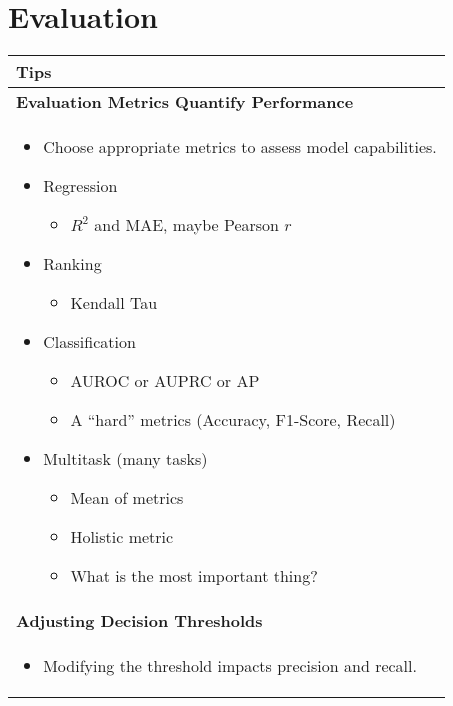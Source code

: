 \section{Evaluation}
\begin{summary}
    \begin{center}
        \begin{tabular}{l}
        \toprule
        \textbf{Tips} \\
        \midrule
        \textbf{Evaluation Metrics Quantify Performance} \\
        \multicolumn{1}{p{\linewidth}}{
        \begin{itemize}
            \item Choose appropriate metrics to assess model capabilities. 
            \item Regression
            \begin{itemize}
                \item \( R^2 \) and MAE, maybe Pearson \( r \)
            \end{itemize}
            \item Ranking
            \begin{itemize}
                \item Kendall Tau
            \end{itemize}
            \item Classification
            \begin{itemize}
                \item AUROC or AUPRC or AP
                \item A ``hard'' metrics (Accuracy, F1-Score, Recall)
            \end{itemize}
            \item Multitask (many tasks)
            \begin{itemize}
                \item Mean of metrics
                \item Holistic metric
                \item What is the most important thing?
            \end{itemize}
        \end{itemize}} \\
        \midrule
        \textbf{Adjusting Decision Thresholds} \\
        \multicolumn{1}{p{\linewidth}}{
        \begin{itemize}
            \item Modifying the threshold impacts precision and recall. 

\end{itemize}}
\end{tabular}
\end{center}
\end{summary}
